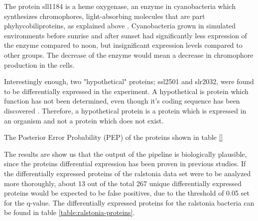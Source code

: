 The protein sll1184 is a heme oxygenase, an enzyme in cyanobacteria which synthesizes chromophores, light-absorbing molecules that are part phyhycobiliproteins, as explained above \cite{heme-oxygenase} \cite{heme-oxygenase-2}. Cyanobacteria grown in simulated environments before sunrise and after sunset had significantly less expression of the enzyme compared to noon, but insignificant expression levels compared to other groups. The decrease of the enzyme would mean a decrease in chromophore production in the cells.

Interestingly enough, two "hypothetical" proteins; ssl2501 and slr2032, were found to be differentially expressed in the experiment. A hypothetical is protein which function has not been determined, even though it's coding sequence has been discovered \cite{hypothetical-protein1} \cite{hypothetical-protein2}. Therefore, a hypothetical protein is a protein which is expressed in an organism and not a protein which does not exist.

The Posterior Error Probability (PEP) of the proteins shown in table \ref{}

The results are show us that the output of the pipeline is biologically plausible, since the proteins differential expression has been proven in previous studies. If the differentially expressed proteins of the ralstonia data set were to be analyzed more thoroughly, about 13 out of the total 267 unique  differentially expressed proteins would be expected to be false positives, due to the threshold of 0.05 set for the q-value. The differentially expressed proteins for the ralstonia bacteria can be found in table \ref{table:ralstonia-proteins}.
